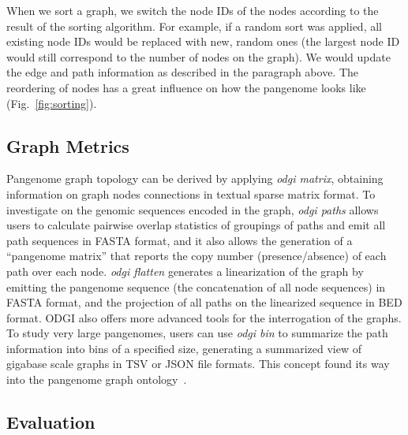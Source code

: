 \documentclass{bioinfo}
\begin{document}
When we sort a graph, we switch the node IDs of the nodes according to the result of the sorting algorithm. 
For example, if a random sort was applied, all existing node IDs would be replaced with new, random ones (the largest node ID would still correspond to the number of nodes on the graph).
We would update the edge and path information as described in the paragraph above.
The reordering of nodes has a great influence on how the pangenome looks like (Fig.~\ref{fig:sorting}).



\subsection{Graph Metrics}
\label{sec:supp_metrics}
Pangenome graph topology can be derived by applying \textit{odgi matrix}, obtaining information on graph nodes connections in textual sparse matrix format.
To investigate on the genomic sequences encoded in the graph, \textit{odgi paths} allows users to calculate pairwise overlap statistics of groupings of paths and emit all path sequences in FASTA format, and it also allows the generation of a ``pangenome matrix'' that reports the copy number (presence/absence) of each path over each node.
\textit{odgi flatten} generates a linearization of the graph by emitting the pangenome sequence (the concatenation of all node sequences) in FASTA format, and the projection of all paths on the linearized sequence in BED format.
ODGI also offers more advanced tools for the interrogation of the graphs.
To study very large pangenomes, users can use \textit{odgi bin} to summarize the path information into bins of a specified size, generating a summarized view of gigabase scale graphs in TSV or JSON file formats.
This concept found its way into the pangenome graph ontology~\citep{Yokoyama2020}. %

\clearpage
\subsection{Evaluation}

\clearpage

\clearpage

\clearpage

\clearpage

\end{document}
